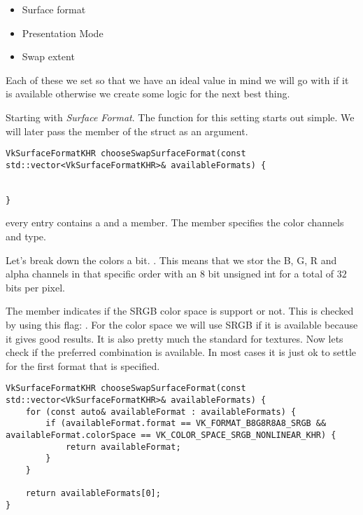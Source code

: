 \begin{itemize}
\item Surface format
\item Presentation Mode
\item Swap extent
\end{itemize}

\par Each of these we set so that we have an ideal value in mind we will go with if it is available otherwise we create some logic for the next best thing.

\par Starting with \emph{Surface Format}. The function for this setting starts out simple. We will later pass the  member of the  struct as an argument.

\begin{center}
\begin{minipage}{0.95\linewidth}
\begin{lstlisting}
VkSurfaceFormatKHR chooseSwapSurfaceFormat(const std::vector<VkSurfaceFormatKHR>& availableFormats) {


}
\end{lstlisting}
\end{minipage}
\end{center}

\par every  entry contains a  and a  member. The  member specifies the color channels and type.

\par Let's break down the colors a bit. . This means that we stor the B, G, R and alpha channels in that specific order with an $8$ bit unsigned int for a total of  $32$ bits per pixel.

\par The  member indicates if the SRGB color space is support or not. This is checked by using this flag: . For the color space we will use SRGB if it is available because it gives good results. It is also pretty much the standard for textures. Now lets check if the preferred combination is available. In most cases it is just ok to settle for the first format that is specified.

\begin{center}
\begin{minipage}{0.95\linewidth}
\begin{lstlisting}
VkSurfaceFormatKHR chooseSwapSurfaceFormat(const std::vector<VkSurfaceFormatKHR>& availableFormats) {
    for (const auto& availableFormat : availableFormats) {
        if (availableFormat.format == VK_FORMAT_B8G8R8A8_SRGB && availableFormat.colorSpace == VK_COLOR_SPACE_SRGB_NONLINEAR_KHR) {
            return availableFormat;
        }
    }

    return availableFormats[0];
}
\end{lstlisting}
\end{minipage}
\end{center}

